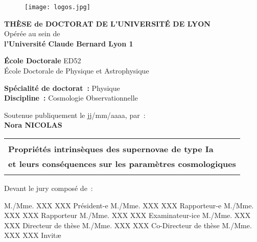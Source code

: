 \documentclass[../main/main.tex]{subfiles}
\begin{document}
\frontmatter

\begin{titlepage}
    \begin{center}
        \begin{figure}[h]
            \centering
            \texttt{[image: logos.jpg]}
        \end{figure}

        \vfill

        {\large\bfseries THÈSE de DOCTORAT DE L'UNIVERSITÉ DE LYON\\}
        {Opérée au sein de\\}
        {\large \bfseries l'Université Claude Bernard Lyon 1\\}
        \bigbreak

        {\large \textbf{École Doctorale} ED52\\
        École Doctorale de Physique et Astrophysique}
        \bigbreak

        {\large \textbf{Spécialité de doctorat~:} Physique \\}
        {\large \textbf{Discipline~:} Cosmologie Observationnelle}

        \vfill

        {Soutenue publiquement le jj/mm/aaaa, par~:\\}
        {\Large\bfseries {Nora NICOLAS}\\}
        \vspace{0.5cm}
        \begin{adjustwidth}{-10pt}{-10pt}
        \begin{tabularx}{\linewidth}{Y}
            \toprule
            \\
            \Large \bfseries Propriétés intrinsèques des supernovae de type Ia\\
            \Large \bfseries et leurs conséquences sur les paramètres
            cosmologiques\\
            \\[-0.2em]
            \bottomrule
        \end{tabularx}
        \end{adjustwidth}

        \vfill

    \end{center}

\vfill

Devant le jury composé de~: \bigbreak

M./Mme. XXX XXX \hfill Président-e\smallbreak
M./Mme. XXX XXX \hfill Rapporteur-e\smallbreak
M./Mme. XXX XXX \hfill Rapporteur\smallbreak
M./Mme. XXX XXX \hfill Examinateur-ice\smallbreak
M./Mme. XXX XXX \hfill Directeur de thèse\smallbreak
M./Mme. XXX XXX \hfill Co-Directeur de thèse\smallbreak
M./Mme. XXX XXX \hfill Invitæ\smallbreak

\vfill

\end{titlepage}
\end{document}
